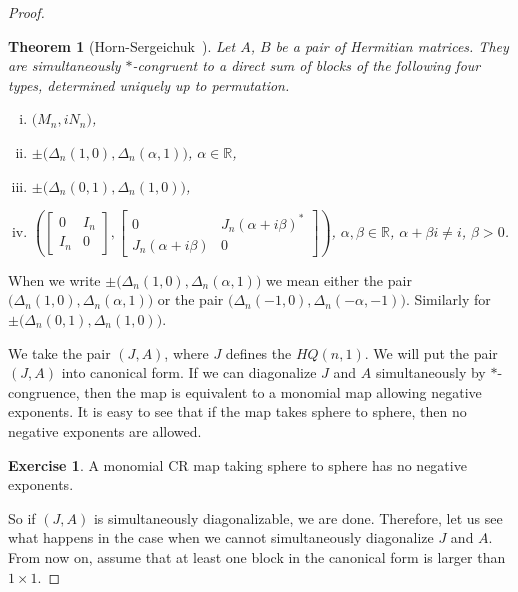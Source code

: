 \documentclass[12pt,openany]{book}
\newcommand{\R}{{\mathbb{R}}}
\theoremstyle{plain}
\newtheorem{thm}{Theorem}[section]
\theoremstyle{remark}
\theoremstyle{definition}
\theoremstyle{exercise}
\newtheorem{exercise}{Exercise}[section]
\theoremstyle{example}
\begin{document}
\begin{proof}
\begin{thm}[Horn-Sergeichuk~\cite{HornSergeichuk}]
Let $A$, $B$ be a pair of Hermitian matrices.  They are simultaneously
$*$-congruent to a direct sum of blocks of the following four types,
determined uniquely up to permutation.
\begin{enumerate}[(i)]
\item $\bigl( M_n, iN_n \bigr)$,
\item $\pm \bigl( \Delta_n(1,0),\Delta_n(\alpha,1) \bigr)$, $\alpha \in \R$,
\item $\pm \bigl( \Delta_n(0,1),\Delta_n(1,0) \bigr)$,
\item $\left(
\begin{bmatrix}
0 & I_n \\
I_n & 0
\end{bmatrix} ,
\begin{bmatrix}
0 & J_n{(\alpha+i\beta)}^* \\
J_n(\alpha+i\beta) & 0
\end{bmatrix}
\right)$, $\alpha,\beta \in \R$, $\alpha+\beta i \not=i$, $\beta > 0$.
\end{enumerate}
\end{thm}

When we write $\pm \bigl( \Delta_n(1,0),\Delta_n(\alpha,1) \bigr)$ we mean
either 
the pair $\bigl( \Delta_n(1,0),\Delta_n(\alpha,1) \bigr)$ or the pair
$\bigl(\Delta_n(-1,0), \Delta_n(-\alpha,-1) \bigr)$.  Similarly for $\pm
\bigl( \Delta_n(0,1),\Delta_n(1,0) \bigr)$.

We take the pair $(J,A)$, where $J$ defines the $HQ(n,1)$.
We will put the pair $(J,A)$ into canonical
form.
If we can diagonalize $J$ and $A$ simultaneously by $*$-congruence, then
the map is equivalent to a monomial map allowing negative exponents.
It is easy to see that if the map takes sphere to sphere, then no negative
exponents are allowed.

\begin{exercise}
A monomial CR map taking sphere to sphere has no negative exponents.
\end{exercise}

So if $(J,A)$ is simultaneously diagonalizable, we are done.
Therefore,
let us see what
happens in the case when we cannot simultaneously diagonalize $J$ and $A$.
From now on, assume that at least
one block in the canonical form is larger than $1 \times 1$.


\end{proof}
\end{document}

